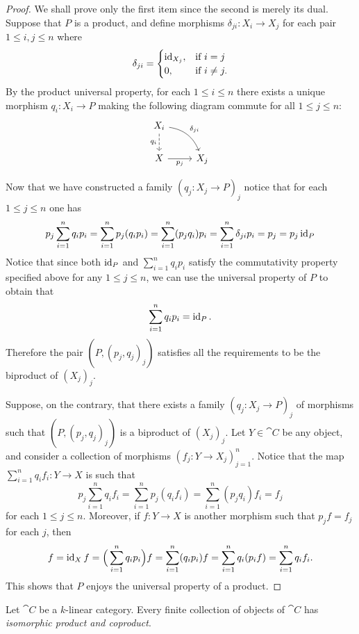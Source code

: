 \begin{proof}
We shall prove only the first item since the second is merely its dual. Suppose
that \(P\) is a product, and define morphisms \(\delta_{j i}: X_i \to X_j\) for each
pair \(1 \leq i, j \leq n\) where
\[
\delta_{j i} =
\begin{cases}
  \operatorname{id}_{X_j}, &\text{if } i = j \\
  0, &\text{if } i \neq j. \\
\end{cases}
\]
By the product universal property, for each \(1 \leq i \leq n\)
there exists a unique morphism \(q_i: X_i \to P\) making the following diagram
commute for all \(1 \leq j \leq n\):
\[
\begin{tikzcd}
X_i
\ar[d, dashed, "q_i"']
\ar[rd, bend left, "\delta_{j i}"]
& \\
X \ar[r, "p_j"']
&X_j
\end{tikzcd}
\]

Now that we have constructed a family \((q_j: X_j \to P)_j\) notice that for each
\(1 \leq j \leq n\) one has
\[
p_j \sum_{i=1}^n q_i p_i
= \sum_{i=1}^n p_j (q_i p_i)
= \sum_{i=1}^{n} (p_j q_i) p_i
= \sum_{i=1}^{n} \delta_{j i} p_i
= p_j
= p_j \operatorname{id}_P
\]
Notice that since both \(\operatorname{id}_P\) and \(\sum_{i=1}^{n} q_i p_i\) satisfy the
commutativity property specified above for any \(1 \leq j \leq n\), we can use the
universal property of \(P\) to obtain that
\[
\sum_{i=1}^{n} q_i p_i = \operatorname{id}_P.
\]
Therefore the pair \((P, (p_j, q_j)_j)\) satisfies all the requirements to be
the biproduct of \((X_j)_j\).

Suppose, on the contrary, that there exists a family \((q_j: X_j \to P)_j\) of
morphisms such that \((P, (p_j, q_j)_j)\) is a biproduct of \((X_j)_j\). Let
\(Y \in \cat C\) be any object, and consider a collection of morphisms
\((f_j: Y \to X_j)_{j=1}^n\). Notice that the map \(\sum_{i=1}^{n} q_i f_i: Y \to X\)
is such that
\[
p_j \sum_{i=1}^n q_i f_i
= \sum_{i=1}^{n} p_j (q_i f_i)
= \sum_{i=1}^{n} (p_j q_i) f_i
= f_j
\]
for each \(1 \leq j \leq n\). Moreover, if \(f: Y \to X\) is another morphism such that
\(p_j f = f_j\) for each \(j\), then
\[
f
= \operatorname{id}_X f
= \Big( \sum_{i=1}^n q_i p_i \Big) f
= \sum_{i=1}^{n} (q_i p_i) f
= \sum_{i=1}^{n} q_i (p_i f)
= \sum_{i=1}^{n} q_i f_i.
\]
This shows that \(P\) enjoys the universal property of a product.
\end{proof}

\begin{corollary}
\label{cor:k-linear-cat-finite-coprod-prod-are-iso}
Let \(\cat C\) be a \(k\)-linear category. Every finite collection of objects of
\(\cat C\) has \emph{isomorphic product and coproduct}.
\end{corollary}

